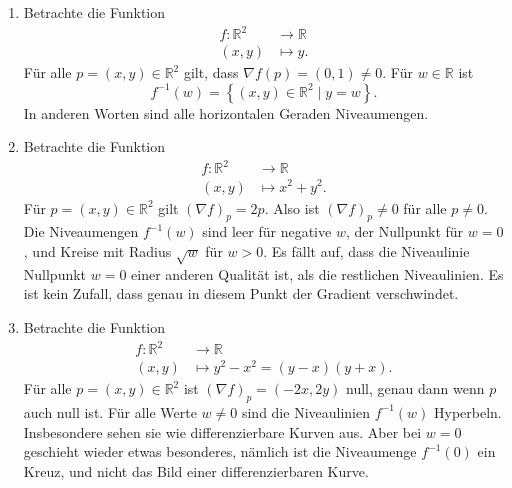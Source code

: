 \documentclass[../main.tex]{subfiles}
\begin{document}
\begin{examples}
  \leavevmode
  \begin{enumerate}[(1)]
    \item Betrachte die Funktion
      \begin{align*}
        f \colon \mathbb{R}^2 & \to \mathbb{R} \\
        (x, y) & \mapsto y.
      \end{align*}
      Für alle $p = (x, y) \in \mathbb{R}^2$ gilt, dass
      ${\nabla f}(p) = (0, 1) \neq 0$.
      Für $w \in \mathbb{R}$ ist
      \[
        f^{-1}(w) = \left\{(x, y) \in \mathbb{R}^2 \mid y = w\right\}.
      \]
      In anderen Worten sind alle horizontalen Geraden
      Niveaumengen.
    \item Betrachte die Funktion
      \begin{align*}
        f \colon \mathbb{R}^2 & \to \mathbb{R} \\
        (x, y) & \mapsto x^2 + y^2.
      \end{align*}
      Für $p = (x, y) \in \mathbb{R}^2$ gilt
      ${(\nabla f)}_p = 2p$.
      Also ist ${(\nabla f)}_p \neq 0$ für alle $p \neq 0$.
      Die Niveaumengen $f^{-1}(w)$ sind leer für negative $w$,
      der Nullpunkt für $w = 0$, und Kreise mit Radius $\sqrt w$
      für $w > 0$.
      Es fällt auf, dass die Niveaulinie Nullpunkt $w = 0$
      einer anderen Qualität ist, als die restlichen Niveaulinien.
      Es ist kein Zufall, dass genau in diesem Punkt der
      Gradient verschwindet.

    \item Betrachte die Funktion
      \begin{align*}
        f \colon \mathbb{R}^2 & \to \mathbb{R} \\
        (x, y) & \mapsto y^2 - x^2 = (y - x)(y + x).
      \end{align*}
      Für alle $p = (x, y) \in \mathbb{R}^2$ ist
      ${(\nabla f)}_p = (-2x, 2y)$ null, genau dann wenn $p$
      auch null ist.
      Für alle Werte $w \neq 0$ sind die
      Niveaulinien $f^{-1}(w)$ Hyperbeln.
      Insbesondere sehen sie wie
      differenzierbare Kurven aus.
      Aber bei $w = 0$ geschieht wieder
      etwas besonderes, nämlich ist
      die Niveaumenge $f^{-1}(0)$
      ein Kreuz, und nicht das
      Bild einer differenzierbaren Kurve.
  \end{enumerate}
\end{examples}
\end{document}
